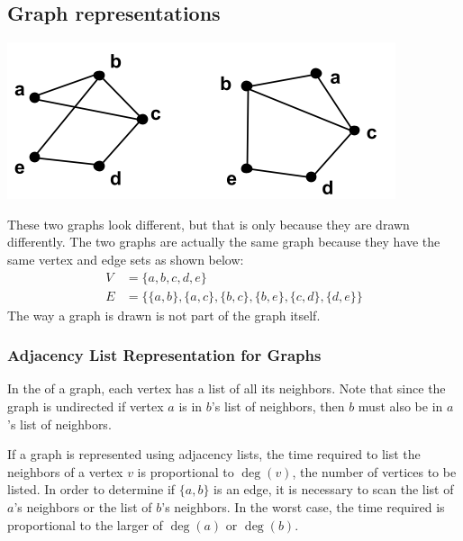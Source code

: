\subsection{Graph representations}
\begin{center}
  \includegraphics[width=0.5\linewidth]{resources/two similar graphs.png}
\end{center}
These two graphs look different, but that is only because they are drawn differently. The two graphs are actually the same graph because they have the same vertex and edge sets as shown below:
\begin{align*}
  V & = \{a,b,c,d,e\}                                       \\
  E & = \{\{a,b\},\{a,c\},\{b,c\},\{b,e\},\{c,d\},\{d,e\}\}
\end{align*}
The way a graph is drawn is not part of the graph itself.

\subsubsection*{Adjacency List Representation for Graphs}
In the  of a graph, each vertex has a list of all its neighbors. Note that since the graph is undirected if vertex $a$ is in $b$'s list of neighbors, then $b$ must also be in $a$'s list of neighbors.

If a graph is represented using adjacency lists, the time required to list the neighbors of a vertex $v$ is proportional to $\deg(v)$, the number of vertices to be listed. In order to determine if $\{a,b\}$ is an edge, it is necessary to scan the list of $a$'s neighbors or the list of $b$'s neighbors. In the worst case, the time required is proportional to the larger of $\deg(a)$ or $\deg(b)$.

